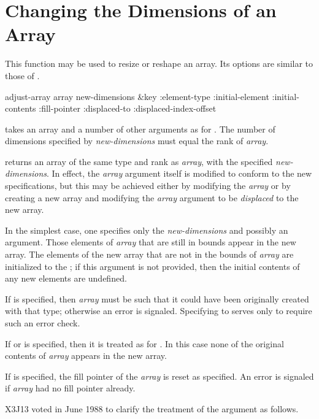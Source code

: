 \section{Changing the Dimensions of an Array}

This function may be used to resize or reshape an array.
Its options are similar to those of .

\begin{defun}[Function]
adjust-array array new-dimensions &key :element-type :initial-element :initial-contents :fill-pointer :displaced-to :displaced-index-offset

 takes an array and a number of other arguments
as for .  The number of dimensions
specified by {\it new-dimensions} must equal the rank of {\it array}.

 returns an array of the same type and rank as {\it array},
with the specified {\it new-dimensions}.  In effect, the {\it array} argument
itself is modified to conform to the new specifications, but this may
be achieved either by modifying the {\it array} or by creating a new
array and modifying the {\it array} argument to be {\it displaced} to the
new array.

In the simplest case, one specifies only the {\it new-dimensions}
and possibly an  argument.
Those elements of {\it array} that
are still in bounds appear in the new array.  The elements of
the new array that are not in the bounds of {\it array} are initialized
to the ; if this argument is not provided,
then the initial contents of any new elements are undefined.

If  is specified, then {\it array} must be such that it could have
been originally created with that type; otherwise an error is signaled.
Specifying  to  serves only to require such an
error check.

If  or 
is specified, then it is treated as for
.  In this case none of the original contents of
{\it array} appears in the new array.

If  is specified, the fill pointer of the {\it array}
is reset as specified.  An error is signaled if {\it array} had no
fill pointer already.

\begin{new}
X3J13 voted in June 1988
to clarify the treatment of the 
argument as follows.


\end{new}
\end{defun}
